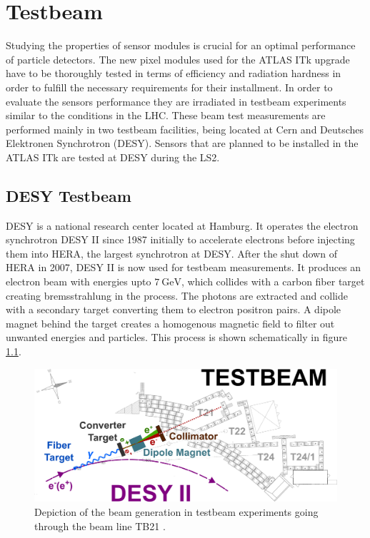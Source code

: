 \chapter{Testbeam}
Studying the properties of sensor modules is crucial for an optimal performance of particle detectors. The new pixel modules used for the ATLAS ITk upgrade have to be thoroughly
tested in terms of efficiency and radiation hardness in order to fulfill the necessary requirements for their installment.
In order to evaluate the sensors performance they are irradiated in testbeam experiments similar to the conditions in the LHC.
These beam test measurements are performed mainly in two testbeam facilities, being located at Cern and Deutsches Elektronen Synchrotron (DESY). Sensors that are planned to be
installed in the ATLAS ITk are tested at DESY during the LS2.

\section{DESY Testbeam}
DESY is a national research center located at Hamburg. It operates the electron synchrotron DESY II since 1987 initially to accelerate electrons before injecting them into
HERA, the largest synchrotron at DESY. After the shut down of HERA in 2007, DESY II is now used for testbeam measurements. It produces an electron beam with energies upto
$\SI{7}{\GeV}$, which collides with a carbon fiber target creating bremsstrahlung in the process. The photons are extracted and collide with a secondary target
converting them to electron positron pairs. A dipole magnet behind the target creates a homogenous magnetic field to filter out unwanted energies and particles. This process
is shown schematically in figure \ref{fig:testbeam}.

\begin{figure}
  \centering
  \includegraphics[height=0.4\textwidth]{images/desy.png}
  \caption{Depiction of the beam generation in testbeam experiments going through the beam line TB21 \cite{testbeam}.}
  \label{fig:testbeam}
\end{figure}


